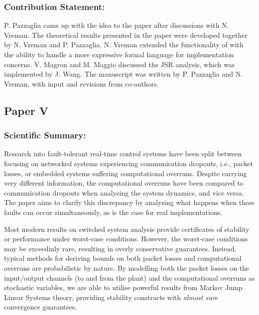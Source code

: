 \subsubsection*{Contribution Statement:}%
%
P. Pazzaglia came up with the idea to the paper after discussions with N. Vreman.
The theoretical results presented in the paper were developed together by N. Vreman and P. Pazzaglia.
N. Vreman extended the functionality of \tool{} with the ability to handle a more expressive formal language for implementation concerns.
V. Magron and M. Maggio discussed the JSR analysis, which was implemented by J. Wang.
The manuscript was written by P. Pazzaglia and N. Vreman, with input and revisions from co-authors.


\subsection*{Paper V}%
%
\begin{quote}
\end{quote}

\subsubsection*{Scientific Summary:}%
%
Research into fault-tolerant real-time control systems have been split between focusing on networked systems experiencing communication dropouts, i.e., packet losses, or embedded systems suffering computational overruns.
Despite carrying very different information, the computational overruns have been compared to communication dropouts when analysing the system dynamics, and vice versa.
The paper aims to clarify this discrepancy by analysing what happens when these faults can occur simultaneously, as is the case for real implementations.

Most modern results on switched system analysis provide certificates of stability or performance under worst-case conditions.
However, the worst-case conditions may be exceedinly rare, resulting in overly conservative guarantees.
Instead, typical methods for deriving bounds on both packet losses and computational overruns are probabilistic by nature.
By modelling both the packet losses on the input/output channels (to and from the plant) and the computational overruns as stochastic variables, we are able to utilise powerful results from Markov Jump Linear Systems theory, providing stability constracts with \emph{almost sure} convergence guarantees.

